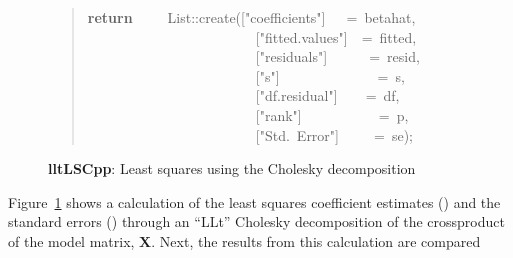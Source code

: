 \documentclass[shortnames,article]{jss}
\newcommand{\hlstd}[1]{\textcolor[rgb]{0,0,0}{#1}}
\newcommand{\hlopt}[1]{\textcolor[rgb]{0,0,0}{#1}}
\newcommand{\hlstr}[1]{\textcolor[rgb]{0.90,0.15,0.15}{#1}}
\newcommand{\hlkwa}[1]{\textcolor[rgb]{0.61,0.13,0.93}{\bf{#1}}}
\newcommand{\hlkwd}[1]{\textcolor[rgb]{0,0,0}{#1}}
\begin{document}
\begin{figure}[tbh]
\begin{quote}
    \hlstd{}\hlkwa{return}\hlstd{\ \ \ \ \ }\hlkwa{}\hlstd{List}\hlopt{::}\hlstd{}\hlkwd{create}\hlstd{}\hlopt{(}\hlstd{\textunderscore }\hlopt{{[}}\hlstd{}\hlstr{"coefficients"}\hlstd{}\hlopt{{]}}\hlstd{\ \ \ }\hlopt{=\ }\hlstd{betahat}\hlopt{,}\hspace*{\fill}\\
    \hlstd{}\hlstd{\ \ \ \ \ \ \ \ \ \ \ \ \ \ \ \ \ \ \ \ \ \ \ \ }\hlstd{\textunderscore }\hlopt{{[}}\hlstd{}\hlstr{"fitted.values"}\hlstd{}\hlopt{{]}}\hlstd{\ \ }\hlopt{=\ }\hlstd{fitted}\hlopt{,}\hspace*{\fill}\\
    \hlstd{}\hlstd{\ \ \ \ \ \ \ \ \ \ \ \ \ \ \ \ \ \ \ \ \ \ \ \ }\hlstd{\textunderscore }\hlopt{{[}}\hlstd{}\hlstr{"residuals"}\hlstd{}\hlopt{{]}}\hlstd{\ \ \ \ \ \ }\hlopt{=\ }\hlstd{resid}\hlopt{,}\hspace*{\fill}\\
    \hlstd{}\hlstd{\ \ \ \ \ \ \ \ \ \ \ \ \ \ \ \ \ \ \ \ \ \ \ \ }\hlstd{\textunderscore }\hlopt{{[}}\hlstd{}\hlstr{"s"}\hlstd{}\hlopt{{]}}\hlstd{\ \ \ \ \ \ \ \ \ \ \ \ \ \ }\hlopt{=\ }\hlstd{s}\hlopt{,}\hspace*{\fill}\\
    \hlstd{}\hlstd{\ \ \ \ \ \ \ \ \ \ \ \ \ \ \ \ \ \ \ \ \ \ \ \ }\hlstd{\textunderscore }\hlopt{{[}}\hlstd{}\hlstr{"df.residual"}\hlstd{}\hlopt{{]}}\hlstd{\ \ \ \ }\hlopt{=\ }\hlstd{df}\hlopt{,}\hspace*{\fill}\\
    \hlstd{}\hlstd{\ \ \ \ \ \ \ \ \ \ \ \ \ \ \ \ \ \ \ \ \ \ \ \ }\hlstd{\textunderscore }\hlopt{{[}}\hlstd{}\hlstr{"rank"}\hlstd{}\hlopt{{]}}\hlstd{\ \ \ \ \ \ \ \ \ \ \ }\hlopt{=\ }\hlstd{p}\hlopt{,}\hspace*{\fill}\\
    \hlstd{}\hlstd{\ \ \ \ \ \ \ \ \ \ \ \ \ \ \ \ \ \ \ \ \ \ \ \ }\hlstd{\textunderscore }\hlopt{{[}}\hlstd{}\hlstr{"Std.\ Error"}\hlstd{}\hlopt{{]}}\hlstd{\ \ \ \ \ }\hlopt{=\ }\hlstd{se}\hlopt{);}\hlstd{}\hspace*{\fill}
    \normalfont
    \normalsize
  \end{quote}
  \caption{\textbf{lltLSCpp}: Least squares using the Cholesky decomposition}
  \label{lltLS}
\end{figure}
Figure~\ref{lltLS} shows a calculation of the least squares coefficient estimates
() and the standard errors () through an
``LLt'' Cholesky decomposition of the crossproduct of the model
matrix, $\bm X$.  Next, the results from this calculation are compared
\end{document}
